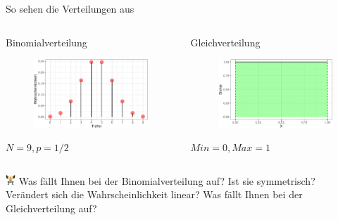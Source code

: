 \documentclass[
  ngerman,
  ignorenonframetext,
]{beamer}
\begin{document}
\begin{frame}{So sehen die Verteilungen aus}
\protect\hypertarget{so-sehen-die-verteilungen-aus}{}
\begin{columns}[T]
\begin{column}{0.5\textwidth}
\begin{block}{Binomialverteilung}
\protect\hypertarget{binomialverteilung}{}
\begin{figure}[H]
\includegraphics[width=0.7\linewidth]{unnamed-chunk-25-1} \end{figure}

\(N=9, p = 1/2\)
\end{block}
\end{column}

\begin{column}{0.5\textwidth}
\begin{block}{Gleichverteilung}
\protect\hypertarget{gleichverteilung}{}
\begin{figure}[H]
\includegraphics[width=0.7\linewidth]{unnamed-chunk-26-1} \end{figure}

\(Min = 0, Max = 1\)
\end{block}
\end{column}
\end{columns}

\includegraphics[width=1em]{../img/weight.pdf} Was fällt Ihnen bei der
Binomialverteilung auf? Ist sie symmetrisch? Verändert sich die
Wahrscheinlichkeit linear? Was fällt Ihnen bei der Gleichverteilung auf?
\end{frame}
\end{document}
